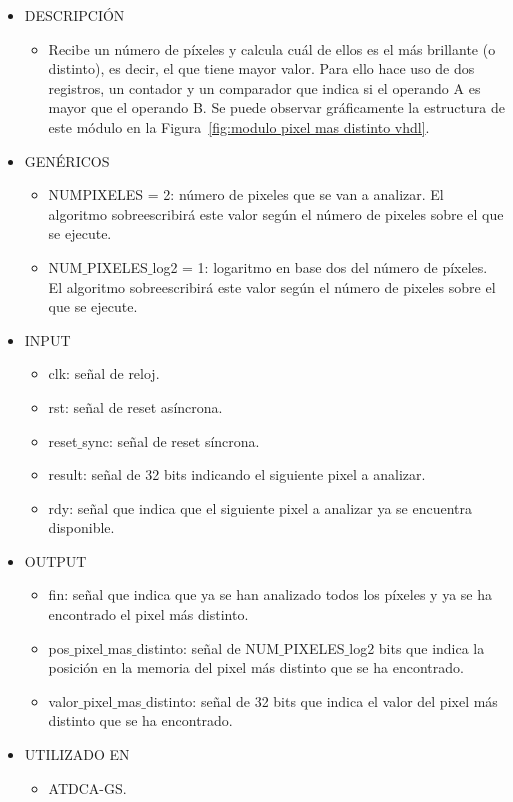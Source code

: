 \begin{itemize}
    \item DESCRIPCIÓN
        \begin{itemize}
            \item Recibe un número de píxeles y calcula cuál de ellos es el más brillante (o distinto), es decir, el que tiene mayor valor. Para ello hace uso de dos registros, un contador y un comparador que indica si el operando A es mayor que el operando B. Se puede observar gráficamente la estructura de este módulo en la Figura~\ref{fig:modulo pixel mas distinto vhdl}.
        \end{itemize}
    \item GENÉRICOS
        \begin{itemize}
            \item NUMPIXELES = 2: número de pixeles que se van a analizar. El algoritmo sobreescribirá este valor según el número de pixeles sobre el que se ejecute.
            \item NUM$\_$PIXELES$\_$log2 = 1: logaritmo en base dos del número de píxeles. El algoritmo sobreescribirá este valor según el número de pixeles sobre el que se ejecute.
        \end{itemize}
    \item INPUT
        \begin{itemize}
            \item clk: señal de reloj.
            \item rst: señal de reset asíncrona.
            \item reset$\_$sync: señal de reset síncrona.
            \item result: señal de 32 bits indicando el siguiente pixel a analizar.
            \item rdy: señal que indica que el siguiente pixel a analizar ya se encuentra disponible.
        \end{itemize}
    \item OUTPUT
        \begin{itemize}
            \item fin: señal que indica que ya se han analizado todos los píxeles y ya se ha encontrado el pixel más distinto.
            \item pos$\_$pixel$\_$mas$\_$distinto: señal de NUM$\_$PIXELES$\_$log2 bits que indica la posición en la memoria del pixel más distinto que se ha encontrado.
            \item valor$\_$pixel$\_$mas$\_$distinto: señal de 32 bits que indica el valor del pixel más distinto que se ha encontrado.
        \end{itemize}
    \item UTILIZADO EN
        \begin{itemize}
            \item ATDCA-GS.
        \end{itemize}
\end{itemize}

